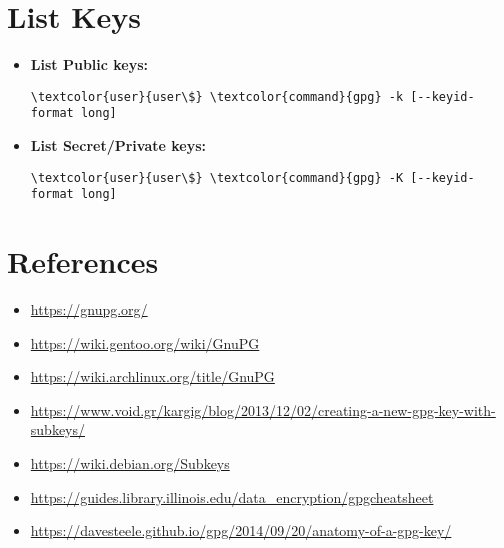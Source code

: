 \documentclass[10pt, a4paper, onecolumn, oneside, titlepage, openany]{book}
\begin{document}
\section{List Keys}
\begin{itemize}
    \item \textbf{List Public keys:}
\begin{Verbatim}[commandchars=\\\{\}]
\textcolor{user}{user\$} \textcolor{command}{gpg} -k [--keyid-format long]
\end{Verbatim}
    \item \textbf{List Secret/Private keys:}
\begin{Verbatim}[commandchars=\\\{\}]
\textcolor{user}{user\$} \textcolor{command}{gpg} -K [--keyid-format long]
\end{Verbatim}
\end{itemize}

\section{References}
\begin{itemize}
    \item \url{https://gnupg.org/}
    \item \url{https://wiki.gentoo.org/wiki/GnuPG}
    \item \url{https://wiki.archlinux.org/title/GnuPG}
    \item \url{https://www.void.gr/kargig/blog/2013/12/02/creating-a-new-gpg-key-with-subkeys/}
    \item \url{https://wiki.debian.org/Subkeys}
    \item \url{https://guides.library.illinois.edu/data_encryption/gpgcheatsheet}
    \item \url{https://davesteele.github.io/gpg/2014/09/20/anatomy-of-a-gpg-key/}
\end{itemize}
\end{document}
